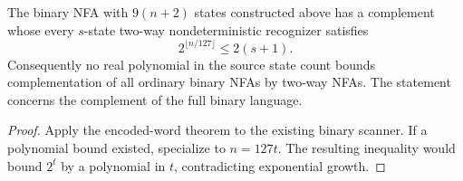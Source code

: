 \begin{corollary}
  \label{cor:models-binary-complement-lower}
  \leanok
  The binary NFA with $9(n+2)$ states constructed above has a complement
  whose every $s$-state two-way nondeterministic recognizer satisfies
  \[
    2^{\lfloor n/127\rfloor}\le2(s+1).
  \]
  Consequently no real polynomial in the source state count bounds
  complementation of all ordinary binary NFAs by two-way NFAs.
  The statement concerns the complement of the full binary language.
\end{corollary}
\begin{proof}
  \leanok
  Apply the encoded-word theorem to the existing binary scanner. If a
  polynomial bound existed, specialize to $n=127t$. The resulting inequality
  would bound $2^t$ by a polynomial in $t$, contradicting exponential growth.
\end{proof}
